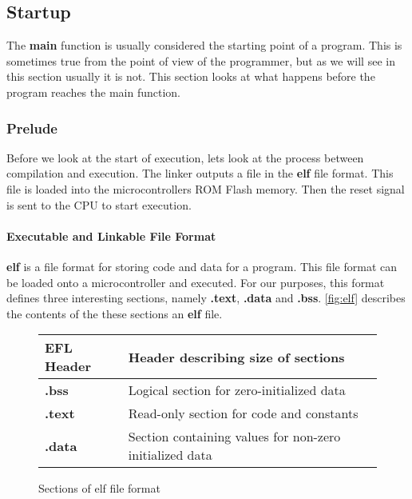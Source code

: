 \subsection{Startup}

The \textbf{main} function is usually considered the starting point of a program.
This is sometimes true from the point of view of the programmer, but as we will see in this section usually it is not.
This section looks at what happens before the program reaches the main function.

\subsubsection{Prelude}

Before we look at the start of execution, lets look at the process between compilation and execution.
The linker outputs a file in the \textbf{elf} file format.
This file is loaded into the microcontrollers ROM Flash memory.
Then the reset signal is sent to the CPU to start execution.

\paragraph{Executable and Linkable File Format}
\textbf{elf} is a file format for storing code and data for a program.
This file format can be loaded onto a microcontroller and executed.
For our purposes, this format defines three interesting sections, namely \textbf{.text}, \textbf{.data} and \textbf{.bss}.
\autoref{fig:elf} describes the contents of the these sections an \textbf{elf} file.

\begin{figure}[H]
  \centering
  \begin{tabular}{|l|l|}
    \hline
    EFL Header & Header describing size of sections \\
    \hline
    \textbf{.bss} & Logical section for zero-initialized data \\
    \hline
    \textbf{.text} & Read-only section for code and constants \\
    \hline
    \textbf{.data} & Section containing values for non-zero initialized data \\
    \hline
  \end{tabular}
  \caption{Sections of elf file format}
  \label{fig:elf}
\end{figure}

